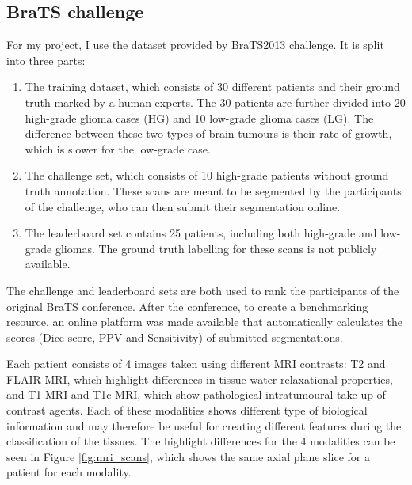 \documentclass[12pt,a4paper,twoside,openright]{report}
\begin{document}
\subsection{BraTS challenge}
For my project, I use the dataset provided by BraTS2013\cite{menze:hal-00935640} challenge. It is split into three parts:
\begin{enumerate}
	\item The training dataset, which consists of 30 different patients and their ground truth marked by a human experts. The 30 patients are further divided into 20 high-grade glioma cases (HG) and 10 low-grade glioma cases (LG). The difference between these two types of brain tumours is their rate  of growth, which is slower for the low-grade case.
	\item The challenge set, which consists of 10 high-grade patients without ground truth annotation. These scans are meant to be segmented by the participants of the challenge, who can then submit their segmentation online. 	
	\item The leaderboard set contains 25 patients, including both high-grade and low-grade gliomas. The ground truth labelling for these scans is not publicly available.
\end{enumerate}
The challenge and leaderboard sets are both used to rank the participants of the original BraTS conference. After the conference, to create a benchmarking resource, an online platform was made available that automatically calculates the scores (Dice score, PPV and Sensitivity) of submitted segmentations.

Each patient consists of 4 images taken using different MRI contrasts: T2 and FLAIR MRI, which highlight differences in tissue water relaxational properties, and T1 MRI and T1c MRI, which show pathological intratumoural take-up of contrast agents. Each of these modalities shows different type of biological information and may therefore be useful for creating different features during the classification of the tissues. The highlight differences for the 4 modalities can be seen in Figure \ref{fig:mri_scans}, which shows the same axial plane slice for a patient for each modality. 
\end{document}
